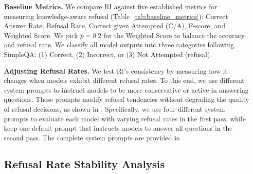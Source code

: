 \documentclass{article} %
\theoremstyle{definition}
\begin{document}
\noindent\textbf{Baseline Metrics.} We compare RI against five established metrics for measuring knowledge-aware refusal (Table~\ref{tab:baseline_metrics}): Correct Answer Rate, Refusal Rate, Correct given Attempted (C/A), F-score, and Weighted Score. 
We pick $p=0.2$ for the Weighted Score to balance the accuracy and refusal rate. 
We classify all model outputs into three categories following SimpleQA: (1) Correct, (2) Incorrect, or (3) Not Attempted (refusal).




\noindent\textbf{Adjusting Refusal Rates.} We test RI's consistency by measuring how it changes when models exhibit different refusal rates. 
To this end, we use different system prompts to instruct models to be more conservative or active in answering questions. 
These prompts modify refusal tendencies without degrading the quality of refusal decisions, as shown in .
Specifically, we use four different system prompts to evaluate each model with varying refusal rates in the first pass, while keep one default prompt that instructs models to answer all questions in the second pass. 
The complete system prompts are provided in .

\vspace{-0.5em}
\subsection{Refusal Rate Stability Analysis}
\label{sec:refusal_index_validation}
\end{document}
